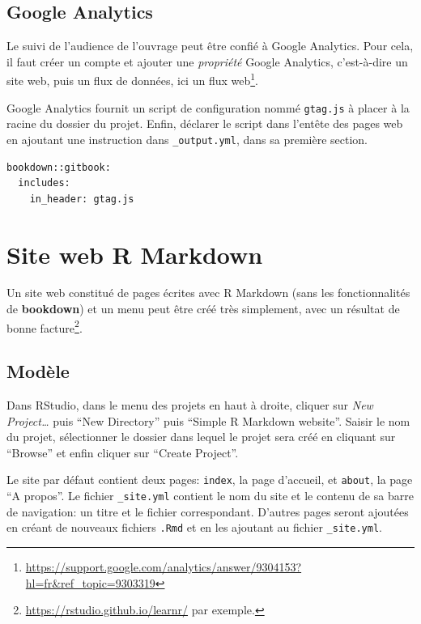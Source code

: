 \documentclass[
  12pt,
  french,
  a4paper,
  extrafontsizes,onecolumn,openright
  ]{memoir}
\begin{document}
\hypertarget{google-analytics}{%
\subsection{Google Analytics}\label{google-analytics}}

Le suivi de l'audience de l'ouvrage peut être confié à Google Analytics.
Pour cela, il faut créer un compte et ajouter une \emph{propriété} Google Analytics, c'est-à-dire un site web, puis un flux de données, ici un flux web\footnote{\url{https://support.google.com/analytics/answer/9304153?hl=fr\&ref_topic=9303319}}.

Google Analytics fournit un script de configuration nommé \texttt{gtag.js} à placer à la racine du dossier du projet.
Enfin, déclarer le script dans l'entête des pages web en ajoutant une instruction dans \texttt{\_output.yml}, dans sa première section.

\begin{verbatim}
bookdown::gitbook:
  includes:
    in_header: gtag.js
\end{verbatim}

\hypertarget{site-web-r-markdown}{%
\section{Site web R Markdown}\label{site-web-r-markdown}}

Un site web constitué de pages écrites avec R Markdown (sans les fonctionnalités de \textbf{bookdown}) et un menu peut être créé très simplement, avec un résultat de bonne facture\footnote{\url{https://rstudio.github.io/learnr/} par exemple.}.

\hypertarget{moduxe8le}{%
\subsection{Modèle}\label{moduxe8le}}

Dans RStudio, dans le menu des projets en haut à droite, cliquer sur \emph{New Project\ldots{}} puis \enquote{New Directory} puis \enquote{Simple R Markdown website}.
Saisir le nom du projet, sélectionner le dossier dans lequel le projet sera créé en cliquant sur \enquote{Browse} et enfin cliquer sur \enquote{Create Project}.

Le site par défaut contient deux pages: \texttt{index}, la page d'accueil, et \texttt{about}, la page \enquote{A propos}.
Le fichier \texttt{\_site.yml} contient le nom du site et le contenu de sa barre de navigation: un titre et le fichier correspondant.
D'autres pages seront ajoutées en créant de nouveaux fichiers \texttt{.Rmd} et en les ajoutant au fichier \texttt{\_site.yml}.
\end{document}
